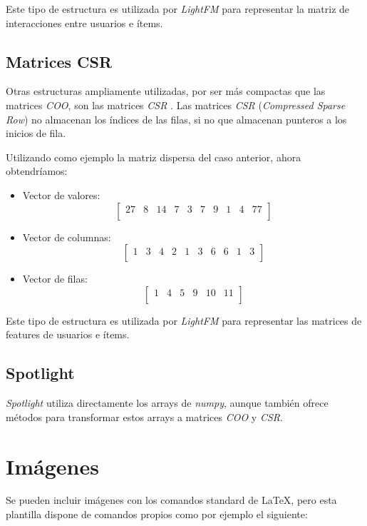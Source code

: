 Este tipo de estructura es utilizada por \textit{LightFM} para representar la matriz de interacciones entre usuarios e ítems.

\subsection{Matrices CSR}\label{matrices-csr}
Otras estructuras ampliamente utilizadas, por ser más compactas que las matrices \textit{COO}, son las matrices \textit{CSR} \cite{csr-matrix}. Las matrices \textit{CSR} (\textit{Compressed Sparse Row}) no almacenan los índices de las filas, si no que almacenan punteros a los inicios de fila.

Utilizando como ejemplo la matriz dispersa del caso anterior, ahora obtendríamos:
\begin{itemize}
\tightlist
\item Vector de valores: \[\begin{bmatrix} 27&8&14&7&3&7&9&1&4&77\\\end{bmatrix}\]
\item Vector de columnas: \[\begin{bmatrix} 1&3&4&2&1&3&6&6&1&3\\
\end{bmatrix}\]
\item Vector de filas: \[\begin{bmatrix} 1&4&5&9&10&11\\\end{bmatrix}\]
\end{itemize}

Este tipo de estructura es utilizada por \textit{LightFM} para representar las matrices de features de usuarios e ítems.

\subsection{Spotlight}\label{spotlight}
\textit{Spotlight} utiliza directamente los arrays de \textit{numpy}, aunque también ofrece métodos para transformar estos arrays a matrices \textit{COO} y \textit{CSR}.

\section{Imágenes}

Se pueden incluir imágenes con los comandos standard de \LaTeX, pero esta plantilla dispone de comandos propios como por ejemplo el siguiente:

